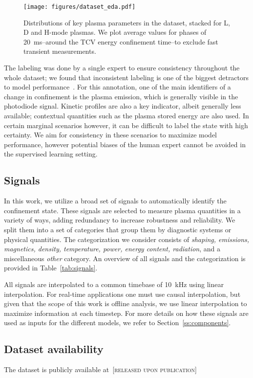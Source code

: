 \begin{figure}[t]
\begin{center}\texttt{[image: figures/dataset\_eda.pdf]}\end{center}
    \caption{Distributions of key plasma parameters in the dataset, stacked for L, D and H-mode plasmas. We plot average values for phases of \SI{20}{\milli\second}--around the TCV energy confinement time--to exclude fast transient measurements.}
    \label{fig:dataset_eda}%
\end{figure}






The labeling was done by a single expert to ensure consistency throughout the whole dataset; we found that inconsistent labeling is one of the biggest detractors to model performance~\cite{matoslhd2021}. 
For this annotation, one of the main identifiers of a change in confinement is the plasma emission, which is generally visible in the photodiode signal. Kinetic profiles are also a key indicator, albeit generally less available; contextual quantities such as the plasma stored energy are also used. In certain marginal scenarios however, it can be difficult to label the state with high certainty. We aim for consistency in these scenarios to maximize model performance, however potential biases of the human expert cannot be avoided in the supervised learning setting.

\subsection{Signals}


In this work, we utilize a broad set of signals to automatically identify the confinement state. These signals are selected to measure plasma quantities in a variety of ways, adding redundancy to increase robustness and reliability. We split them into a set of categories that group them by diagnostic systems or physical quantities. The categorization we consider consists of \textit{shaping, emissions, magnetics, density, temperature, power, energy content, radiation}, and a miscellaneous \textit{other} category. An overview of all signals and the categorization is provided in Table~\ref{tab:signals}.

All signals are interpolated to a common timebase of \SI{10}{\kilo\hertz} using linear interpolation. For real-time applications one must use causal interpolation, but given that the scope of this work is offline analysis, we use linear interpolation to maximize information at each timestep. For more details on how these signals are used as inputs for the different models, we refer to Section~\ref{ss:components}.

\subsection{Dataset availability}
 The dataset is publicly available at~{[\textsc{released upon publication}]}


